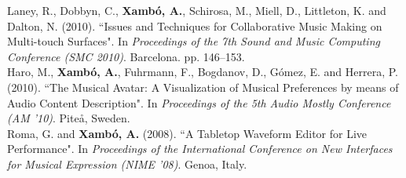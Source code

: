 \documentclass[10pt, a4paper]{article}
\newcommand{\years}[1]{\marginnote{\scriptsize #1}}
\begin{document}
\years{2010b}Laney, R., Dobbyn, C., \textbf{Xambó, A.}, Schirosa, M., Miell, D., Littleton, K. and Dalton, N. (2010). “Issues and Techniques for Collaborative Music Making on Multi-touch Surfaces". In \emph{Proceedings of the 7th Sound and Music Computing Conference (SMC 2010)}. Barcelona. pp. 146–153.\\
\years{2010a}Haro, M., \textbf{Xambó, A.}, Fuhrmann, F., Bogdanov, D., Gómez, E. and Herrera, P. (2010). “The Musical Avatar: A Visualization of Musical Preferences by means of Audio Content Description". In \emph{Proceedings of the 5th Audio Mostly Conference (AM '10)}. Piteå, Sweden.\\
\years{2008}Roma, G. and \textbf{Xambó, A.} (2008). “A Tabletop Waveform Editor for Live Performance". In \emph{Proceedings of the International Conference on New Interfaces for Musical Expression (NIME '08)}. Genoa, Italy.
\end{document}
